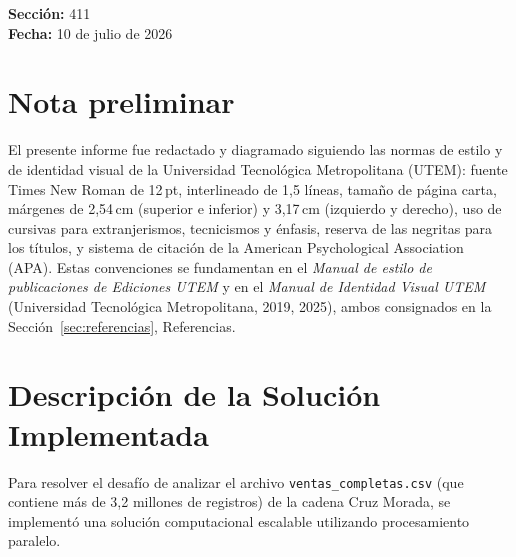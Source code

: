 \documentclass[12pt,letterpaper]{article}
\begin{document}
\begin{titlepage}
\begin{flushleft}
\begin{minipage}{0.75\textwidth}
            {\Large \textbf{\textcolor{primary}{Sección:}} 411}\\[0.3cm]

            {\large \textbf{\textcolor{primary}{Fecha:}} 10 de julio de 2026}

        \end{minipage}
    \end{flushleft}
\end{titlepage}

\newpage
\tableofcontents

\newpage

\section*{Nota preliminar}
El presente informe fue redactado y diagramado siguiendo las normas de estilo y de identidad visual de la Universidad Tecnológica Metropolitana (UTEM): fuente Times New Roman de 12\,pt, interlineado de 1,5 líneas, tamaño de página carta, márgenes de 2,54\,cm (superior e inferior) y 3,17\,cm (izquierdo y derecho), uso de cursivas para extranjerismos, tecnicismos y énfasis, reserva de las negritas para los títulos, y sistema de citación de la American Psychological Association (APA). Estas convenciones se fundamentan en el \textit{Manual de estilo de publicaciones de Ediciones UTEM} y en el \textit{Manual de Identidad Visual UTEM} (Universidad Tecnológica Metropolitana, 2019, 2025), ambos consignados en la Sección~\ref{sec:referencias}, Referencias.

\newpage

\section{Descripción de la Solución Implementada}
Para resolver el desafío de analizar el archivo \texttt{ventas\_completas.csv} (que contiene más de 3,2 millones de registros) de la cadena Cruz Morada, se implementó una solución computacional escalable utilizando procesamiento paralelo.
\end{document}
